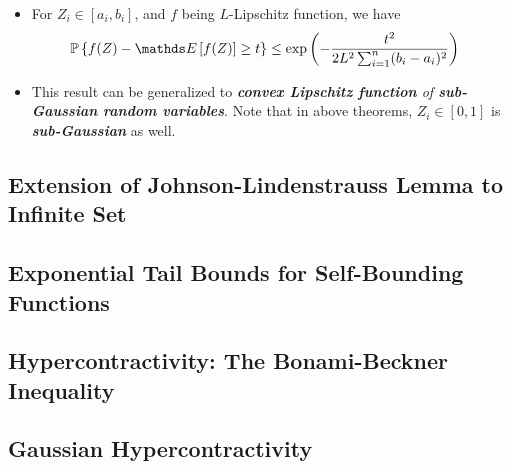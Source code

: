 \documentclass[11pt]{article}
\begin{document}
\begin{itemize}
\item \begin{remark}
For $Z_i \in [a_i, b_i]$, and $f$ being $L$-Lipschitz function, we have
\begin{align*}
\bP\set{f(Z) - \E{}{f(Z)} \ge t } &\le \exp\paren{- \frac{t^2}{2L^2\sum_{i=1}^n(b_i - a_i)^2}}
\end{align*}
\end{remark}

\item \begin{remark}
This result can be generalized to \emph{\textbf{convex Lipschitz function} of \textbf{sub-Gaussian random variables}}. Note that in above theorems, $Z_i \in [0, 1]$ is \emph{\textbf{sub-Gaussian}} as well. 
\end{remark}
\end{itemize}

\subsection{Extension of Johnson-Lindenstrauss Lemma to Infinite Set}


\subsection{Exponential Tail Bounds for Self-Bounding Functions}

\subsection{Hypercontractivity: The Bonami-Beckner Inequality}
\subsection{Gaussian Hypercontractivity}



\newpage


\end{document}
